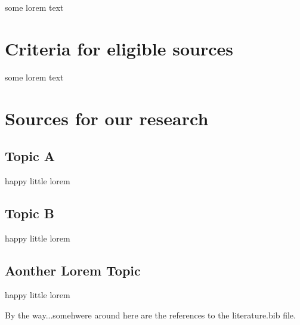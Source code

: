 \documentclass[titlepage, a4paper, 11pt]{scrartcl}
\begin{document}
some lorem text

\section{Criteria for eligible sources}

some lorem text

\section{Sources for our research}

\subsection{Topic A}

happy little lorem

\subsection{Topic B}

happy little lorem

\subsection{Aonther Lorem Topic}

happy little lorem

By the way...somehwere around here are the references to the literature.bib file.

 

\end{document}
